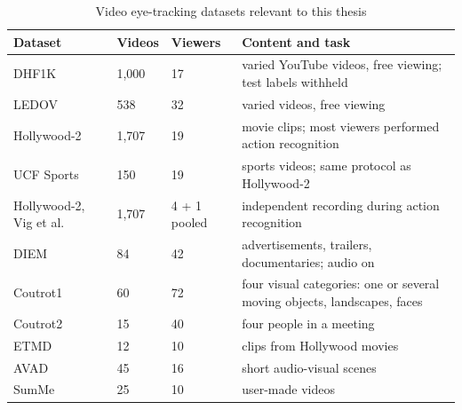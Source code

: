 \begin{table}[htbp]
  \centering
  \caption{Video eye-tracking datasets relevant to this thesis}\label{tab:lit-datasets}
  \footnotesize
  \begin{tabularx}{\textwidth}{@{}>{\raggedright}p{2.5cm}>{\raggedright}p{1.6cm}>{\raggedright}p{2.4cm}>{\raggedright\arraybackslash}X@{}}
    \toprule
    \textbf{Dataset} & \textbf{Videos} & \textbf{Viewers} & \textbf{Content and task} \\
    \midrule
    DHF1K~\cite{wang2018revisiting,wang2021revisiting} & 1,000 & 17 & varied YouTube videos, free viewing; test labels withheld \\
    LEDOV~\cite{jiang2018deepvs} & 538 & 32 & varied videos, free viewing \\
    Hollywood-2~\cite{marszalek2009actions,mathe2015actions} & 1,707 & 19 & movie clips; most viewers performed action recognition \\
    UCF Sports~\cite{rodriguez2008action,mathe2015actions} & 150 & 19 & sports videos; same protocol as Hollywood-2 \\
    Hollywood-2, Vig et al.~\cite{vig2012space} & 1,707 & 4 + 1 pooled & independent recording during action recognition \\
    DIEM~\cite{mital2011clustering} & 84 & 42 & advertisements, trailers, documentaries; audio on \\
    Coutrot1~\cite{coutrot2014how} & 60 & 72 & four visual categories: one or several moving objects, landscapes, faces \\
    Coutrot2~\cite{coutrot2015efficient} & 15 & 40 & four people in a meeting \\
    ETMD~\cite{koutras2015perceptually,tsiami2019behaviorally} & 12 & 10 & clips from Hollywood movies \\
    AVAD~\cite{min2016fixation} & 45 & 16 & short audio-visual scenes \\
    SumMe~\cite{gygli2014creating,tsiami2019behaviorally} & 25 & 10 & user-made videos \\
    \bottomrule
  \end{tabularx}
\end{table}

